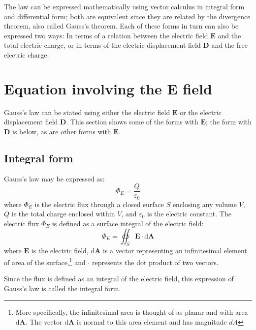 \documentclass[a4paper, 12pt]{article}
\begin{document}
The law can be expressed mathematically using vector calculus in integral form and differential form; both are equivalent since they are related by the divergence theorem, also called Gauss's theorem. Each of these forms in turn can also be expressed two ways: In terms of a relation between the electric field \(\mathbf{E}\) and the total electric charge, or in terms of the electric displacement field \(\mathbf{D}\) and the free electric charge.

\section{Equation involving the \(\mathbf{E}\) field} \label{sec:eqEfield}
Gauss's law can be stated using either the electric field \(\mathbf{E}\) or the electric displacement field \(\mathbf{D}\). This section shows some of the forms with \(\mathbf{E}\); the form with \(\mathbf{D}\) is below, as are other forms with \(\mathbf{E}\). 

\subsection{Integral form}
Gauss's law may be expressed as:
\[
    \Phi_E = \frac{Q}{\varepsilon_0}
\]
where \(\Phi_E\) is the electric flux through a closed surface \(S\) enclosing any volume \(V\), \(Q\) is the total charge enclosed within \(V\), and \(\varepsilon_0\) is the electric constant. The electric flux \(\Phi_E\) is defined as a surface integral of the electric field: 
\[
    \Phi_E = \oiint_S \mathbf{E} \cdot \mathrm{d} \mathbf{A}
\]
where \(\mathbf{E}\) is the electric field, \(\mathrm{d}\mathbf{A}\) is a vector representing an infinitesimal element of area of the surface,\footnote{More specifically, the infinitesimal area is thought of as planar and with area \(\mathrm{d}\mathbf{A}\). The vector \(\mathrm{d}\mathbf{A}\) is normal to this area element and has magnitude \(dA\)} and \(\cdot\) represents the dot product of two vectors.

Since the flux is defined as an integral of the electric field, this expression of Gauss's law is called the integral form. 
\end{document}

